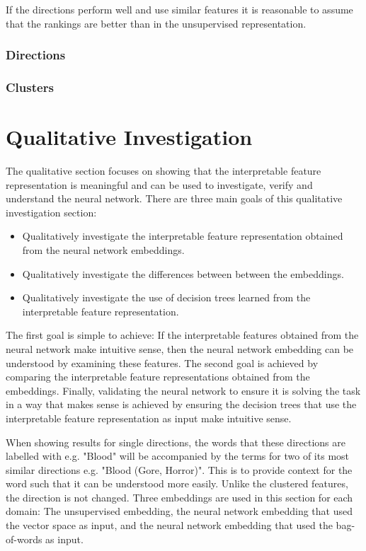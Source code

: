 If the directions perform well and use similar features it is reasonable to assume that the rankings are better than in the unsupervised representation.





\subsubsection{Directions}


\subsubsection{Clusters}

\section{Qualitative Investigation}\label{ch5:qual}

The qualitative section  focuses on showing that the interpretable feature representation is meaningful and can be used to investigate, verify and understand the neural network. There are three main goals of this qualitative investigation section:

\begin{itemize}
	\item Qualitatively investigate the interpretable feature representation obtained from the neural network embeddings.
	\item Qualitatively investigate the differences between between the embeddings.
	\item Qualitatively investigate the use of decision trees learned from the interpretable feature representation.
\end{itemize}

The first goal is simple to achieve: If the interpretable features obtained from the neural network make intuitive sense, then the neural network embedding can be understood by examining these features. The second goal is achieved by comparing the interpretable feature representations obtained from the embeddings. Finally, validating the neural network to ensure it is solving the task in a way that makes sense is achieved by ensuring the decision trees that use the interpretable feature representation as input make intuitive sense. 

When showing results for single directions, the words that these directions are labelled with e.g. "Blood" will be accompanied by the terms for two of its most similar directions e.g. "Blood (Gore, Horror)". This is to provide context for the word such that it can be understood more easily. Unlike the clustered features, the direction is not changed. Three embeddings are used in this section for each domain: The unsupervised embedding, the neural network embedding that used the vector space as input, and the neural network embedding that used the bag-of-words as input. 

